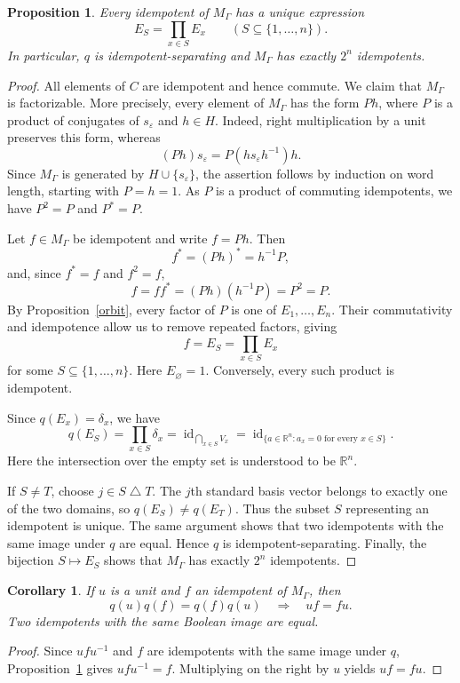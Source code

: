 \documentclass[a4paper, 12pt, reqno]{amsart}
\newtheorem{proposition}[theorem]{Proposition}
\newtheorem{corollary}[theorem]{Corollary}
\theoremstyle{definition}
\newcommand{\eps}{\varepsilon}
\begin{document}
\begin{proposition}\label{idemsep}
Every idempotent of $M_\Gamma$ has a unique expression
\[
E_S=\prod_{x\in S}E_x\qquad(S\subseteq\{1,\ldots,n\}).\]
In particular, $q$ is idempotent-separating and $M_\Gamma$ has exactly $2^n$ idempotents.
\end{proposition}


\begin{proof}
All elements of $C$ are idempotent and hence commute. We claim that $M_\Gamma$ is factorizable. More precisely, every element of $M_\Gamma$ has the form $Ph$, where $P$ is a product of conjugates of $s_\eps$ and $h\in H$. Indeed, right multiplication by a unit preserves this form, whereas
\[
(Ph)s_\eps=P(hs_\eps h^{-1})h.
\]
Since $M_\Gamma$ is generated by $H\cup\{s_\eps\}$, the assertion follows by induction on word length, starting with $P=h=1$. As $P$ is a product of commuting idempotents, we have $P^2=P$ and $P^*=P$.

Let $f\in M_\Gamma$ be idempotent and write $f=Ph$.
Then
\[
f^*=(Ph)^*=h^{-1}P,
\]
and, since $f^*=f$ and $f^2=f$,
\[
f=ff^*=(Ph)(h^{-1}P)=P^2=P.
\]
By Proposition~\ref{orbit}, every factor of $P$ is one of $E_1,\ldots,E_n$. Their commutativity and idempotence allow us to remove repeated factors, giving
\[
f=E_S=\prod_{x\in S}E_x
\]
for some $S\subseteq\{1,\ldots,n\}$. Here $E_\varnothing=1$. Conversely, every such product is idempotent.

Since $q(E_x)=\delta_x$, we have
\[
q(E_S) =\prod_{x\in S}\delta_x =\operatorname{id}_{\bigcap_{x\in S}V_x} =\operatorname{id}_{\{a\in\mathbb R^n:a_x=0\text{ for every }x\in S\}}.
\]
Here the intersection over the empty set is understood to be $\mathbb R^n$.


If $S\ne T$, choose $j\in S\mathbin{\triangle}T$. The $j$th standard basis vector belongs to exactly one of the two domains, so $q(E_S)\ne q(E_T)$. Thus the subset $S$ representing an idempotent is unique. The same argument shows that two idempotents with the same image under $q$ are equal. Hence $q$ is idempotent-separating. Finally, the bijection $S\mapsto E_S$ shows that $M_\Gamma$ has exactly $2^n$ idempotents.
\end{proof}


\begin{corollary}\label{lift}
If $u$ is a unit and $f$ an idempotent of $M_\Gamma$, then
\[
q(u)q(f)=q(f)q(u)\quad\Longrightarrow\quad uf=fu.
\]
Two idempotents with the same Boolean image are equal.
\end{corollary}
\begin{proof}
Since $ufu^{-1}$ and $f$ are idempotents with the same image under $q$, Proposition~\ref{idemsep} gives $ufu^{-1}=f$. Multiplying on the right by $u$ yields $uf=fu$.
\end{proof}
\end{document}
